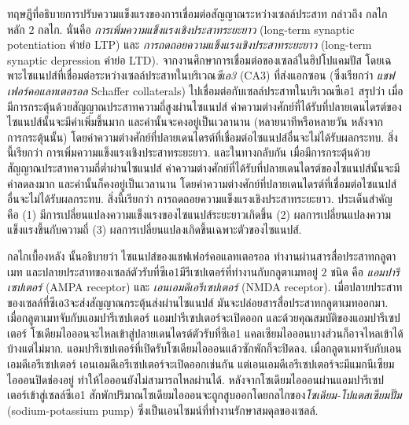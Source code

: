 {\begin{shaded}
ทฤษฎีที่อธิบายการปรับความแข็งแรงของการเชื่อมต่อสัญญาณระหว่างเซลล์ประสาท
กล่าวถึง กลไกหลัก $2$ กลไก.
นั่นคือ \textit{การเพิ่มความแข็งแรงเชิงประสาทระยะยาว} (long-term synaptic potentiation คำย่อ LTP) และ \textit{การถดถอยความแข็งแรงเชิงประสาทระยะยาว} (long-term synaptic depression คำย่อ LTD).
จากงานศึกษาการเชื่อมต่อของเซลล์ในฮิปโปแคมปัส โดยเฉพาะไซแนปส์ที่เชื่อมต่อระหว่างเซลล์ประสาทในบริเวณ\textit{ซีเอ3} (CA3) ที่ส่งแอกซอน (ซึ่งเรียกว่า \textit{แชฟเฟอร์คอแลทเตอรอล} Schaffer collaterals) ไปเชื่อมต่อกับเซลล์ประสาทในบริเวณซีเอ1 
สรุปว่า
เมื่อมีการกระตุ้นด้วยสัญญาณประสาทความถี่สูงผ่านไซแนปส์ ค่าความต่างศักย์ที่ได้รับที่ปลายเดนไดรต์ของไซแนปส์นั้นจะมีค่าเพิ่มขึ้นมาก และค่านั้นจะคงอยู่เป็นเวลานาน (หลายนาทีหรือหลายวัน หลังจากการกระตุ้นนั้น)
โดยค่าความต่างศักย์ที่ปลายเดนไดรต์ที่เชื่อมต่อไซแนปส์อื่นจะไม่ได้รับผลกระทบ.
สิ่งนี้เรียกว่า การเพิ่มความแข็งแรงเชิงประสาทระยะยาว.
และในทางกลับกัน
เมื่อมีการกระตุ้นด้วยสัญญาณประสาทความถี่ต่ำผ่านไซแนปส์ ค่าความต่างศักย์ที่ได้รับที่ปลายเดนไดรต์ของไซแนปส์นั้นจะมีค่าลดลงมาก และค่านั้นก็คงอยู่เป็นเวลานาน
โดยค่าความต่างศักย์ที่ปลายเดนไดรต์ที่เชื่อมต่อไซแนปส์อื่นจะไม่ได้รับผลกระทบ.
สิ่งนี้เรียกว่า การถดถอยความแข็งแรงเชิงประสาทระยะยาว.
ประเด็นสำคัญ คือ (1) มีการเปลี่ยนแปลงความแข็งแรงของไซแนปส์ระยะยาวเกิดขึ้น
(2) ผลการเปลี่ยนแปลงความแข็งแรงขึ้นกับความถี่
(3) ผลการเปลี่ยนแปลงเกิดขึ้นเฉพาะตัวของไซแนปส์.

กลไกเบื้องหลัง%
นั้นอธิบายว่า
ไซแนปส์ของแชฟเฟอร์คอแลทเตอรอล ทำงานผ่านสารสื่อประสาทกลูตาเมท
และปลายประสาทของเซลล์ตัวรับที่ซีเอ1มีรีเซปเตอร์ที่ทำงานกับกลูตาเมทอยู่ $2$ ชนิด คือ \textit{แอมปารีเซปเตอร์} (AMPA receptor) และ \textit{เอนเอมดีเอรีเซปเตอร์} (NMDA receptor).
เมื่อปลายประสาทของเซลล์ที่ซีเอ3จะส่งสัญญาณกระตุ้นส่งผ่านไซแนปส์ 
มันจะปล่อยสารสื่อประสาทกลูตาเมทออกมา.
เมื่อกลูตาเมทจับกับแอมปารีเซปเตอร์ แอมปารีเซปเตอร์จะเปิดออก 
และด้วยคุณสมบัติของแอมปารีเซปเตอร์ โซเดียมไอออนจะไหลเข้าสู่ปลายเดนไดรต์ตัวรับที่ซีเอ1
แคลเซียมไอออนบางส่วนก็อาจไหลเข้าได้บ้างแต่ไม่มาก.
แอมปารีเซปเตอร์ที่เปิดรับโซเดียมไอออนแล้วซักพักก็จะปิดลง.
%
เมื่อกลูตาเมทจับกับเอนเอมดีเอรีเซปเตอร์ เอนเอมดีเอรีเซปเตอร์จะเปิดออกเช่นกัน แต่เอนเอมดีเอรีเซปเตอร์จะมีแมกนีเซียมไอออนปิดช่องอยู่ ทำให้ไอออนยังไม่สามารถไหลผ่านได้.
หลังจากโซเดียมไอออนผ่านแอมปารีเซปเตอร์เข้าสู่เซลล์ซีเอ1
สักพักปริมาณโซเดียมไอออนจะถูกสูบออกโดยกลไกของ\textit{โซเดียม-โปแตสเซียมปั๊ม} (sodium-potassium pump) ซึ่งเป็นเอนไซมน์ที่ทำงานรักษาสมดุลของเซลล์.


\end{shaded}}
